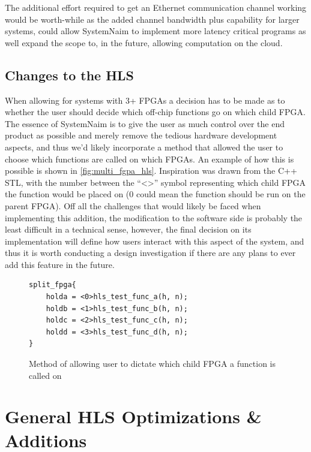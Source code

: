 The additional effort required to get an Ethernet communication channel working would be worth-while as the added channel bandwidth plus capability for larger systems, could allow SystemNaim to implement more latency critical programs as well expand the scope to, in the future, allowing computation on the cloud.

\subsection{Changes to the HLS}

When allowing for systems with 3+ FPGAs a decision has to be made as to whether the user should decide which off-chip functions go on which child FPGA. The essence of SystemNaim is to give the user as much control over the end product as possible and merely remove the tedious hardware development aspects, and thus we'd likely incorporate a method that allowed the user to choose which functions are called on which FPGAs. An example of how this is possible is shown in \autoref{fig:multi_fgpa_hls}. Inspiration was drawn from the C++ STL, with the number between the “<>” symbol representing which child FPGA the function would be placed on (0 could mean the function should be run on the parent FPGA). Off all the challenges that would likely be faced when implementing this addition, the modification to the software side is probably the least difficult in a technical sense, however, the final decision on its implementation will define how users interact with this aspect of the system, and thus it is worth conducting a design investigation if there are any plans to ever add this feature in the future.

\begin{figure}[!htb]
    \centering
    \begin{minipage}{0.5\textwidth}
    \begin{verbatim}
split_fpga{
    holda = <0>hls_test_func_a(h, n);
    holdb = <1>hls_test_func_b(h, n);
    holdc = <2>hls_test_func_c(h, n);
    holdd = <3>hls_test_func_d(h, n);
}
    \end{verbatim}     
    \end{minipage}
    \caption{Method of allowing user to dictate which child FPGA a function is called on}
    \label{fig:multi_fgpa_hls}
\end{figure}

\section{General HLS Optimizations \& Additions}

